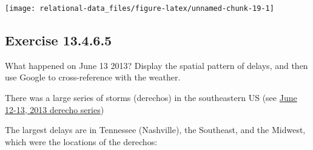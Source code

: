 \documentclass[]{book}
\newenvironment{Shaded}{\begin{snugshade}}{\end{snugshade}}
\newcommand{\DataTypeTok}[1]{\textcolor[rgb]{0.13,0.29,0.53}{#1}}
\newcommand{\KeywordTok}[1]{\textcolor[rgb]{0.13,0.29,0.53}{\textbf{#1}}}
\newcommand{\NormalTok}[1]{#1}
\newcommand{\OperatorTok}[1]{\textcolor[rgb]{0.81,0.36,0.00}{\textbf{#1}}}
\newcommand{\OtherTok}[1]{\textcolor[rgb]{0.56,0.35,0.01}{#1}}
\newcommand{\StringTok}[1]{\textcolor[rgb]{0.31,0.60,0.02}{#1}}
\theoremstyle{plain}
\theoremstyle{remark}
\begin{document}
\begin{Shaded}
\end{Shaded}

\begin{center}\texttt{[image: relational-data\_files/figure-latex/unnamed-chunk-19-1]} \end{center}

\hypertarget{exercise-13.4.6.5}{%
\subsection*{\texorpdfstring{Exercise
{13.4.6.5}}{Exercise 13.4.6.5}}\label{exercise-13.4.6.5}}

What happened on June 13 2013? Display the spatial pattern of delays,
and then use Google to cross-reference with the weather.

There was a large series of storms (derechos) in the southeastern US
(see
\href{https://en.wikipedia.org/wiki/June_12\%E2\%80\%9313,_2013_derecho_series}{June
12-13, 2013 derecho series})

The largest delays are in Tennessee (Nashville), the Southeast, and the
Midwest, which were the locations of the derechos:
\end{document}
